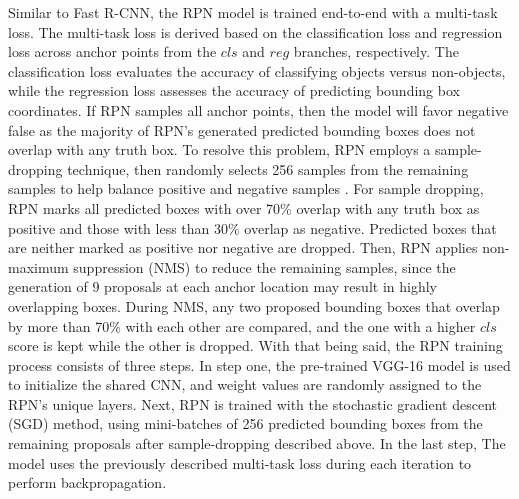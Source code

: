 Similar to Fast R-CNN, the RPN model is trained end-to-end with a multi-task loss. The multi-task loss is derived based on the classification loss and regression loss across anchor points from the $cls$ and $reg$ branches, respectively. The classification loss evaluates the accuracy of classifying objects versus non-objects, while the regression loss assesses the accuracy of predicting bounding box coordinates. If RPN samples all anchor points, then the model will favor negative false as the majority of RPN's generated predicted bounding boxes does not overlap with any truth box. To resolve this problem, RPN employs a sample-dropping technique, then randomly selects 256 samples from the remaining samples to help balance positive and negative samples \cite{faster_rcnn_2015}. For sample dropping, RPN marks all predicted boxes with over 70\% overlap with any truth box as positive and those with less than 30\% overlap as negative. Predicted boxes that are neither marked as positive nor negative are dropped. Then, RPN applies non-maximum suppression (NMS) to reduce the remaining samples, since the generation of 9 proposals at each anchor location may result in highly overlapping boxes. During NMS, any two proposed bounding boxes that overlap by more than 70\% with each other are compared, and the one with a higher $cls$ score is kept while the other is dropped. With that being said, the RPN training process consists of three steps. In step one, the pre-trained VGG-16 model is used to initialize the shared CNN, and weight values are randomly assigned to the RPN's unique layers. Next, RPN is trained with the stochastic gradient descent (SGD) method, using mini-batches of 256 predicted bounding boxes from the remaining proposals after sample-dropping described above. In the last step, The model uses the previously described multi-task loss during each iteration to perform backpropagation.

